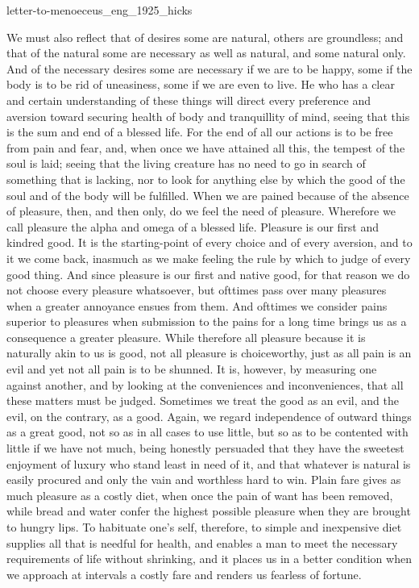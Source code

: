 \documentclass{stex}
\begin{document}
\begin{smodule}{letter-to-menoeceus_eng_1925_hicks}
\begin{sparagraph}[id=letter-to-menoeceus,name=Letter to Menoeceus]
  We must also reflect that of desires some are natural, others are groundless; and that of the natural some are necessary as well as natural, and some natural only.
  And of the necessary desires some are necessary if we are to be happy, some if the body is to be rid of uneasiness, some if we are even to live.
  He who has a clear and certain understanding of these things will direct every preference and aversion toward securing health of body and tranquillity of mind, seeing that this is the sum and end of a blessed life.
  For the end of all our actions is to be free from pain and fear, and, when once we have attained all this, the tempest of the soul is laid; seeing that the living creature has no need to go in search of something that is lacking, nor to look for anything else by which the good of the soul and of the body will be fulfilled.
  When we are pained because of the absence of pleasure, then, and then only, do we feel the need of pleasure.
  Wherefore we call pleasure the alpha and omega of a blessed life.
  Pleasure is our first and kindred good.
  It is the starting-point of every choice and of every aversion, and to it we come back, inasmuch as we make feeling the rule by which to judge of every good thing.
  And since pleasure is our first and native good, for that reason we do not choose every pleasure whatsoever, but ofttimes pass over many pleasures when a greater annoyance ensues from them.
  And ofttimes we consider pains superior to pleasures when submission to the pains for a long time brings us as a consequence a greater pleasure.
  While therefore all pleasure because it is naturally akin to us is good, not all pleasure is choiceworthy, just as all pain is an evil and yet not all pain is to be shunned.
  It is, however, by measuring one against another, and by looking at the conveniences and inconveniences, that all these matters must be judged.
  Sometimes we treat the good as an evil, and the evil, on the contrary, as a good.
  Again, we regard independence of outward things as a great good, not so as in all cases to use little, but so as to be contented with little if we have not much, being honestly persuaded that they have the sweetest enjoyment of luxury who stand least in need of it, and that whatever is natural is easily procured and only the vain and worthless hard to win.
  Plain fare gives as much pleasure as a costly diet, when once the pain of want has been removed,
  while bread and water confer the highest possible pleasure when they are brought to hungry lips.
  To habituate one's self, therefore, to simple and inexpensive diet supplies all that is needful for health, and enables a man to meet the necessary requirements of life without shrinking, and it places us in a better condition when we approach at intervals a costly fare and renders us fearless of fortune.


\end{sparagraph}
\end{smodule}
\end{document}
